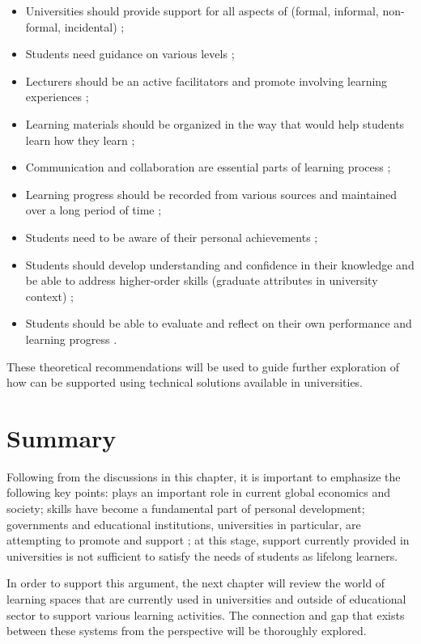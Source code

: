\begin{itemize}
  \item Universities should provide support for all aspects of \LLLs (formal,
  informal, non-formal, incidental) \citep{Smidt2011};
  \item Students need guidance on various levels \citep{Leone2019};
  \item Lecturers should be an active facilitators and promote involving
  learning experiences \citep{Leone2019}; 
  \item Learning materials should be organized in the way that would help
students learn how they learn \citep{Medel-Anonuevo2001};
  \item Communication and collaboration are essential parts of learning process
  \citep{Schaffert2008};
  \item Learning progress should be recorded from various sources and maintained
  over a long period of time \citep{Kay2008};
  \item Students need to be aware of their personal achievements
\citep{Schuetze2006};
  \item Students should develop understanding and confidence in their knowledge
  and be able to address higher-order skills (graduate attributes in university
  context) \citep{Hart1999};
  \item Students should be able to evaluate and reflect on their own performance
and learning progress \citep{Mourtos2003}.
\end{itemize} 

These theoretical recommendations will be used to guide further exploration of
 how \LLLs can be supported using technical solutions available in universities.

\section{Summary} 

Following from the discussions in this chapter, it is important to emphasize
the following key points: \LLLs plays an important role in current global
economics and society; \LLLs skills have become a fundamental part of personal
development; governments and educational institutions, universities in
particular, are attempting to promote and support \LLLsn; at this stage, \LLLs
support currently provided in universities is not sufficient to satisfy the
needs of students as lifelong learners.

In order to support this argument, the next chapter will review the world of
learning spaces that are currently used in universities and outside of
educational sector to support various learning activities. The connection and
gap that exists between these systems from the \LLLs perspective will be
thoroughly explored.

